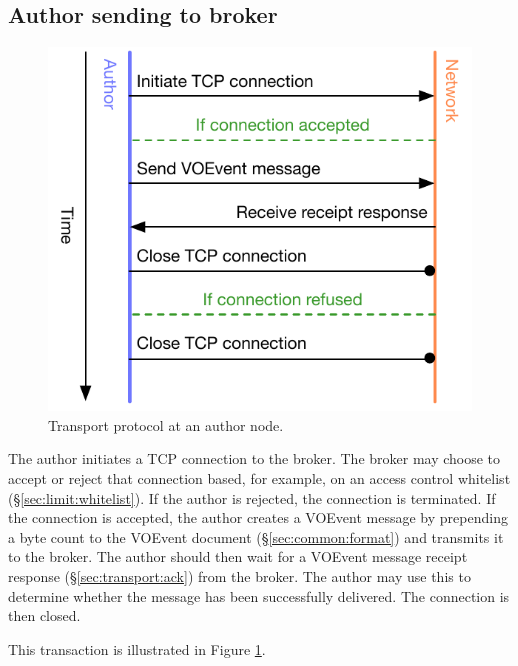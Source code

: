 \documentclass[a4paper,11pt]{ivoa}
\begin{document}
\subsection{Author sending to broker}
\label{sec:protocol:authortobroker}

\begin{figure}
  \begin{center}
  \includegraphics{figures/authortobroker.pdf}
  \end{center}

  \caption{Transport protocol at an author node.}

  \label{fig:protocol:authortobroker}
\end{figure}

The author initiates a TCP connection to the broker. The broker may choose to
accept or reject that connection based, for example, on an access control
whitelist (\S\ref{sec:limit:whitelist}). If the author is rejected, the
connection is terminated. If the connection is accepted, the author creates a
VOEvent message by prepending a byte count to the VOEvent document
(\S\ref{sec:common:format}) and transmits it to the broker. The author should
then wait for a VOEvent message receipt response (\S\ref{sec:transport:ack})
from the broker. The author may use this to determine whether the message
has been successfully delivered. The connection is then closed.

This transaction is illustrated in Figure \ref{fig:protocol:authortobroker}.
\end{document}
